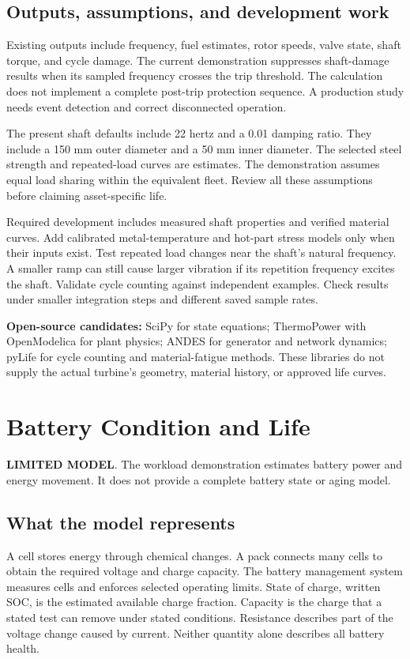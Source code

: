 \documentclass[11pt,a4paper]{report}
\newcommand{\limited}{\textbf{\textcolor{reportamber}{LIMITED MODEL}}}
\begin{document}
\section{Outputs, assumptions, and development work}
Existing outputs include frequency, fuel estimates, rotor speeds, valve state, shaft torque, and cycle damage.
The current demonstration suppresses shaft-damage results when its sampled frequency crosses the trip threshold.
The calculation does not implement a complete post-trip protection sequence.
A production study needs event detection and correct disconnected operation.

The present shaft defaults include 22 hertz and a 0.01 damping ratio.
They include a 150 mm outer diameter and a 50 mm inner diameter.
The selected steel strength and repeated-load curves are estimates.
The demonstration assumes equal load sharing within the equivalent fleet.
Review all these assumptions before claiming asset-specific life.

Required development includes measured shaft properties and verified material curves.
Add calibrated metal-temperature and hot-part stress models only when their inputs exist.
Test repeated load changes near the shaft's natural frequency.
A smaller ramp can still cause larger vibration if its repetition frequency excites the shaft.
Validate cycle counting against independent examples.
Check results under smaller integration steps and different saved sample rates.

\textbf{Open-source candidates:} SciPy for state equations;
ThermoPower with OpenModelica for plant physics;
ANDES for generator and network dynamics;
pyLife for cycle counting and material-fatigue methods.
These libraries do not supply the actual turbine's geometry, material history, or approved life curves.

\chapter{Battery Condition and Life}
\label{chap:battery}
\limited. The workload demonstration estimates battery power and energy movement.
It does not provide a complete battery state or aging model.

\section{What the model represents}
A cell stores energy through chemical changes.
A pack connects many cells to obtain the required voltage and charge capacity.
The battery management system measures cells and enforces selected operating limits.
State of charge, written SOC, is the estimated available charge fraction.
Capacity is the charge that a stated test can remove under stated conditions.
Resistance describes part of the voltage change caused by current.
Neither quantity alone describes all battery health.
\end{document}
